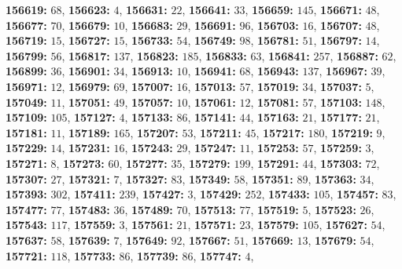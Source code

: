 \textsf{\bfseries 156619:} $68$, \textsf{\bfseries 156623:} $4$, \textsf{\bfseries 156631:} $22$, \textsf{\bfseries 156641:} $33$, \textsf{\bfseries 156659:} $145$, \textsf{\bfseries 156671:} $48$, \textsf{\bfseries 156677:} $70$, \textsf{\bfseries 156679:} $10$, \textsf{\bfseries 156683:} $29$, \textsf{\bfseries 156691:} $96$, \textsf{\bfseries 156703:} $16$, \textsf{\bfseries 156707:} $48$, \textsf{\bfseries 156719:} $15$, \textsf{\bfseries 156727:} $15$, \textsf{\bfseries 156733:} $54$, \textsf{\bfseries 156749:} $98$, \textsf{\bfseries 156781:} $51$, \textsf{\bfseries 156797:} $14$, \textsf{\bfseries 156799:} $56$, \textsf{\bfseries 156817:} $137$, \textsf{\bfseries 156823:} $185$, \textsf{\bfseries 156833:} $63$, \textsf{\bfseries 156841:} $257$, \textsf{\bfseries 156887:} $62$, \textsf{\bfseries 156899:} $36$, \textsf{\bfseries 156901:} $34$, \textsf{\bfseries 156913:} $10$, \textsf{\bfseries 156941:} $68$, \textsf{\bfseries 156943:} $137$, \textsf{\bfseries 156967:} $39$, \textsf{\bfseries 156971:} $12$, \textsf{\bfseries 156979:} $69$, \textsf{\bfseries 157007:} $16$, \textsf{\bfseries 157013:} $57$, \textsf{\bfseries 157019:} $34$, \textsf{\bfseries 157037:} $5$, \textsf{\bfseries 157049:} $11$, \textsf{\bfseries 157051:} $49$, \textsf{\bfseries 157057:} $10$, \textsf{\bfseries 157061:} $12$, \textsf{\bfseries 157081:} $57$, \textsf{\bfseries 157103:} $148$, \textsf{\bfseries 157109:} $105$, \textsf{\bfseries 157127:} $4$, \textsf{\bfseries 157133:} $86$, \textsf{\bfseries 157141:} $44$, \textsf{\bfseries 157163:} $21$, \textsf{\bfseries 157177:} $21$, \textsf{\bfseries 157181:} $11$, \textsf{\bfseries 157189:} $165$, \textsf{\bfseries 157207:} $53$, \textsf{\bfseries 157211:} $45$, \textsf{\bfseries 157217:} $180$, \textsf{\bfseries 157219:} $9$, \textsf{\bfseries 157229:} $14$, \textsf{\bfseries 157231:} $16$, \textsf{\bfseries 157243:} $29$, \textsf{\bfseries 157247:} $11$, \textsf{\bfseries 157253:} $57$, \textsf{\bfseries 157259:} $3$, \textsf{\bfseries 157271:} $8$, \textsf{\bfseries 157273:} $60$, \textsf{\bfseries 157277:} $35$, \textsf{\bfseries 157279:} $199$, \textsf{\bfseries 157291:} $44$, \textsf{\bfseries 157303:} $72$, \textsf{\bfseries 157307:} $27$, \textsf{\bfseries 157321:} $7$, \textsf{\bfseries 157327:} $83$, \textsf{\bfseries 157349:} $58$, \textsf{\bfseries 157351:} $89$, \textsf{\bfseries 157363:} $34$, \textsf{\bfseries 157393:} $302$, \textsf{\bfseries 157411:} $239$, \textsf{\bfseries 157427:} $3$, \textsf{\bfseries 157429:} $252$, \textsf{\bfseries 157433:} $105$, \textsf{\bfseries 157457:} $83$, \textsf{\bfseries 157477:} $77$, \textsf{\bfseries 157483:} $36$, \textsf{\bfseries 157489:} $70$, \textsf{\bfseries 157513:} $77$, \textsf{\bfseries 157519:} $5$, \textsf{\bfseries 157523:} $26$, \textsf{\bfseries 157543:} $117$, \textsf{\bfseries 157559:} $3$, \textsf{\bfseries 157561:} $21$, \textsf{\bfseries 157571:} $23$, \textsf{\bfseries 157579:} $105$, \textsf{\bfseries 157627:} $54$, \textsf{\bfseries 157637:} $58$, \textsf{\bfseries 157639:} $7$, \textsf{\bfseries 157649:} $92$, \textsf{\bfseries 157667:} $51$, \textsf{\bfseries 157669:} $13$, \textsf{\bfseries 157679:} $54$, \textsf{\bfseries 157721:} $118$, \textsf{\bfseries 157733:} $86$, \textsf{\bfseries 157739:} $86$, \textsf{\bfseries 157747:} $4$, 
